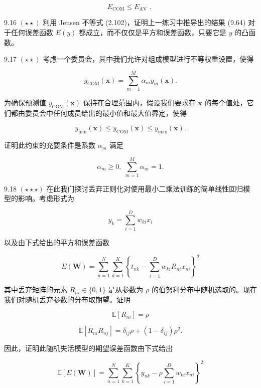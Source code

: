 \documentclass[10pt]{report}
\begin{document}
\[
{E}_{\mathrm{{COM}}} \leq  {E}_{\mathrm{{AV}}}\text{ . } \tag{9.64}
\]

9.16 \(\left( {\star  \star  }\right)\) 利用 Jensen 不等式 (2.102)，证明上一练习中推导出的结果 (9.64) 对于任何误差函数 \(E\left( y\right)\) 都成立，而不仅仅是平方和误差函数，只要它是 \(y\) 的凸函数。

9.17 \(\left( {\star  \star  }\right)\) 考虑一个委员会，其中我们允许对组成模型进行不等权重设置，使得

\[
{y}_{\mathrm{{COM}}}\left( \mathbf{x}\right)  = \mathop{\sum }\limits_{{m = 1}}^{M}{\alpha }_{m}{y}_{m}\left( \mathbf{x}\right) . \tag{9.65}
\]

为确保预测值 \({y}_{\mathrm{{COM}}}\left( \mathbf{x}\right)\) 保持在合理范围内，假设我们要求在 \(\mathbf{x}\) 的每个值处，它们都由委员会中任何成员给出的最小值和最大值界定，使得

\[
{y}_{\min }\left( \mathbf{x}\right)  \leq  {y}_{\mathrm{{COM}}}\left( \mathbf{x}\right)  \leq  {y}_{\max }\left( \mathbf{x}\right) . \tag{9.66}
\]

证明此约束的充要条件是系数 \({\alpha }_{m}\) 满足

\[
{\alpha }_{m} \geq  0,\;\mathop{\sum }\limits_{{m = 1}}^{M}{\alpha }_{m} = 1. \tag{9.67}
\]

9.18 \(\left( {\star  \star   \star  }\right)\) 在此我们探讨丢弃正则化对使用最小二乘法训练的简单线性回归模型的影响。考虑形式为

\[
{y}_{k} = \mathop{\sum }\limits_{{i = 1}}^{D}{w}_{ki}{x}_{i} \tag{9.68}
\]

以及由下式给出的平方和误差函数

\[
E\left( \mathbf{W}\right)  = \mathop{\sum }\limits_{{n = 1}}^{N}\mathop{\sum }\limits_{{k = 1}}^{K}{\left\{  {t}_{nk} - \mathop{\sum }\limits_{{i = 1}}^{D}{w}_{ki}{R}_{ni}{x}_{ni}\right\}  }^{2} \tag{9.69}
\]

其中丢弃矩阵的元素 \({R}_{ni} \in  \{ 0,1\}\) 是从参数为 \(\rho\) 的伯努利分布中随机选取的。现在我们对随机丢弃参数的分布取期望。证明

\[
\mathbb{E}\left\lbrack  {R}_{ni}\right\rbrack   = \rho  \tag{9.70}
\]

\[
\mathbb{E}\left\lbrack  {{R}_{ni}{R}_{nj}}\right\rbrack   = {\delta }_{ij}\rho  + \left( {1 - {\delta }_{ij}}\right) {\rho }^{2}. \tag{9.71}
\]

因此，证明此随机失活模型的期望误差函数由下式给出

\[
\mathbb{E}\left\lbrack  {E\left( \mathbf{W}\right) }\right\rbrack   = \mathop{\sum }\limits_{{n = 1}}^{N}\mathop{\sum }\limits_{{k = 1}}^{K}{\left\{  {y}_{nk} - \rho \mathop{\sum }\limits_{{i = 1}}^{D}{w}_{ki}{x}_{ni}\right\}  }^{2} \tag{9.72}
\]
\end{document}
